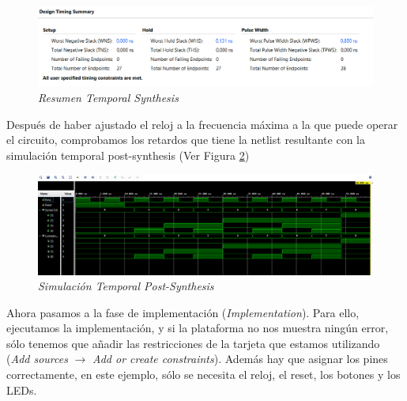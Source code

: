 \begin{figure}[H]
    \centering
    \includegraphics[width = 1\textwidth]{imagenes/analisis.png}
    \caption{\textit{Resumen Temporal Synthesis}}\label{analisis}
\end{figure}

Después de haber ajustado el reloj a la frecuencia máxima a la que puede operar el circuito, comprobamos los retardos que tiene la netlist resultante 
con la simulación temporal post-synthesis (Ver Figura \ref{stps})

\begin{figure}[H]
    \centering
    \includegraphics[width = 1\textwidth]{imagenes/simulaciontemporal.png}
    \caption{\textit{Simulación Temporal Post-Synthesis}}\label{stps}
\end{figure}

Ahora pasamos a la fase de implementación (\textit{Implementation}). Para ello, ejecutamos la implementación, y si la plataforma no nos muestra 
ningún error, sólo tenemos que añadir las restricciones de la tarjeta que estamos utilizando (\textit{Add sources} $\rightarrow$ \textit{Add or create constraints}). 
Además hay que asignar los pines correctamente, en este ejemplo, sólo se necesita el reloj, el reset, los botones y los LEDs.

\vspace{1cm}

